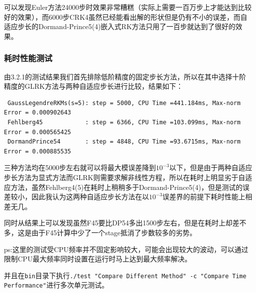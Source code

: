 \documentclass{article}
\begin{document}
可以发现Euler方法24000步时效果非常糟糕（实际上需要一百万步上才能达到比较好的效果），而6000步CRK4虽然已经能看出解的形状但是仍有不小的误差，而自适应步长的Dormand-Prince5(4)嵌入式RK方法只用了一百步就达到了很好的效果。

\subsubsection{耗时性能测试}
由3.2.1的测试结果我们首先排除低阶精度的固定步长方法，所以在其中选择十阶精度的GLRK方法与两种自适应步长进行比较，结果如下：
\begin{verbatim}
 GaussLegendreRKMs(s=5): step = 5000, CPU Time =441.184ms, Max-norm Error = 0.000902643
 Fehlberg45            : step = 6366, CPU Time =103.099ms, Max-norm Error = 0.000565425
 DormandPrince54       : step = 4848, CPU Time =93.6715ms, Max-norm Error = 0.000885535    
\end{verbatim}

三种方法均在5000步左右就可以将最大模误差降到$10^{-3}$以下，但是由于两种自适应步长方法为显式方法而GLRK则需要求解非线性方程，所以在耗时上明显劣于自适应方法，虽然Fehlberg4(5)在耗时上稍稍多于Dormand-Prince5(4)，但是测试的误差较小，因此我认为这两种自适应步长方法在以$10^{-3}$误差界的前提下耗时性能上相差无几。

同时从结果上可以发现虽然F45要比DP54多出1500步左右，但是在耗时上却差不多，这是由于F45计算中少了一个stage抵消了步数较多的劣势。

ps:这里的测试受CPU频率并不固定影响较大，可能会出现较大的波动，可以通过限制CPU最大频率同时设置在运行时马上达到最大频率解决。

并且在\verb|bin|目录下执行\verb|./test "Compare Different Method" -c "Compare Time Performance"|进行多次单元测试。
\end{document}
